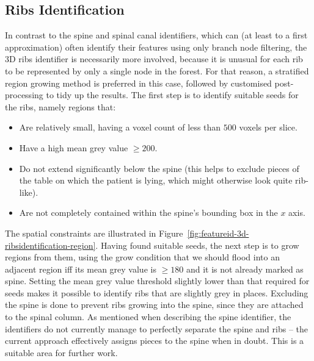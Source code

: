 \afterpage{\clearpage}
\newpage

\subsection{Ribs Identification}
\label{subsec:featureid-3d-ribsidentification}


\noindent In contrast to the spine and spinal canal identifiers, which can (at least to a first approximation) often identify their features using only branch node filtering, the 3D ribs identifier is necessarily more involved, because it is unusual for each rib to be represented by only a single node in the forest. For that reason, a stratified region growing method is preferred in this case, followed by customised post-processing to tidy up the results. The first step is to identify suitable seeds for the ribs, namely regions that:
%
\begin{itemize}

\item Are relatively small, having a voxel count of less than $500$ voxels per slice.
\item Have a high mean grey value $\ge 200$.
\item Do not extend significantly below the spine (this helps to exclude pieces of the table on which the patient is lying, which might otherwise look quite rib-like).
\item Are not completely contained within the spine's bounding box in the $x$ axis.

\end{itemize}
%
The spatial constraints are illustrated in Figure~\ref{fig:featureid-3d-ribsidentification-region}. Having found suitable seeds, the next step is to grow regions from them, using the grow condition that we should flood into an adjacent region iff its mean grey value is $\ge 180$ and it is not already marked as spine. Setting the mean grey value threshold slightly lower than that required for seeds makes it possible to identify ribs that are slightly grey in places. Excluding the spine is done to prevent ribs growing into the spine, since they are attached to the spinal column. As mentioned when describing the spine identifier, the identifiers do not currently manage to perfectly separate the spine and ribs -- the current approach effectively assigns pieces to the spine when in doubt. This is a suitable area for further work.

